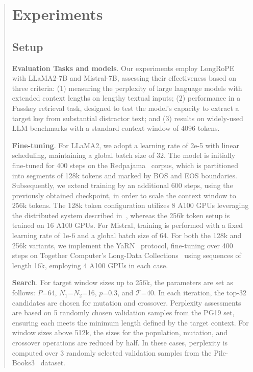 \begin{abstract}
 \section{Experiments}

\label{sec:exp}
\subsection{Setup}
\textbf{Evaluation Tasks and models}. Our experiments employ LongRoPE with LLaMA2-7B and Mistral-7B, assessing their effectiveness based on three criteria: (1) measuring the perplexity of large language models with extended context lengths on lengthy textual inputs; (2) performance in a Passkey retrieval task, designed to test the model’s capacity to extract a target key from substantial distractor text; and (3) results on widely-used LLM benchmarks with a standard context window of 4096 tokens.

\textbf{Fine-tuning}. For LLaMA2, we adopt a learning rate of 2e-5 with linear scheduling, maintaining a global batch size of 32. The model is initially fine-tuned for 400 steps on the Redpajama~\cite{redpajama} corpus, which is partitioned into segments of 128k tokens and marked by BOS and EOS boundaries. Subsequently, we extend training by an additional 600 steps, using the previously obtained checkpoint, in order to scale the context window to 256k tokens. The 128k token configuration utilizes 8 A100 GPUs leveraging the distributed system described in~\cite{cube}, whereas the 256k token setup is trained on 16 A100 GPUs. For Mistral, training is performed with a fixed learning rate of 1e-6 and a global batch size of 64. For both the 128k and 256k variants, we implement the YaRN~\cite{yarn} protocol, fine-tuning over 400 steps on Together Computer's Long-Data Collections~\cite{mistraldata} using sequences of length 16k, employing 4 A100 GPUs in each case.

\textbf{Search}. For target window sizes up to 256k, the parameters are set as follows: $P$=64, $N_1$=$N_2$=16, $p$=0.3, and $\mathcal{T}$=40. In each iteration, the top-32 candidates are chosen for mutation and crossover. Perplexity assessments are based on 5 randomly chosen validation samples from the PG19 set, ensuring each meets the minimum length defined by the target context. For window sizes above 512k, the sizes for the population, mutation, and crossover operations are reduced by half. In these cases, perplexity is computed over 3 randomly selected validation samples from the Pile-Books3~\cite{pile} dataset.


\end{abstract}
